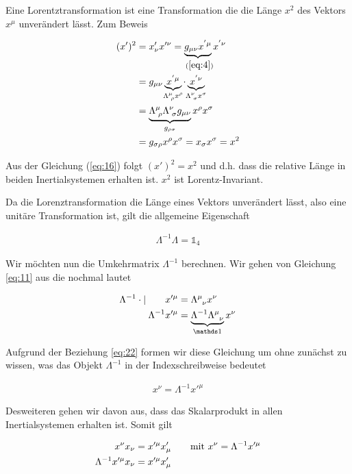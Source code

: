 Eine Lorentztransformation ist eine Transformation die die Länge \(x^2\)  des Vektors \(x^\mu\) unverändert lässt. Zum Beweis

\begin{align}
  \label{eq:16}
  (x')^2 &= x'_\nu x'^\nu = \underbr{ g_{\mu\nu}x^{'\mu}}_{~(\ref{eq:4})}x^{'\nu} \notag \\
&=  g_{\mu\nu}\underbr{ x^{'\mu}}_{\Lambda^\mu_{\,\, \rho}x^\rho}\cdot \underbr{ x^{'\nu}}_{\Lambda^\nu_{\,\, \sigma}x^\sigma} \notag \\
 &= \underbrace{\Lambda^\mu_{\,\, \rho}  \Lambda^\nu_{\,\, \sigma}g_{\mu\nu}}_{g_{\rho\sigma}}x^\rho x^\sigma\notag \\
&= g_{\sigma\rho} x^\rho x^\sigma  = x_\sigma x^\sigma = x^2
\end{align}

Aus der Gleichung (\ref{eq:16})  folgt  \((x')^2 = x^2\) und d.h. dass die relative Länge in beiden Inertialsystemen erhalten ist. \(x^2\) ist Lorentz-Invariant. 


Da die Lorenztransformation die Länge eines Vektors unverändert lässt, also eine unitäre Transformation ist, gilt die allgemeine Eigenschaft


\begin{align}
  \label{eq:22}
  \Lambda^{-1}\Lambda=\mathds 1_4
\end{align}

Wir möchten nun die Umkehrmatrix  \(\Lambda^{-1}\) berechnen. Wir gehen von Gleichung \eqref{eq:11} aus die nochmal lautet

\begin{align}
  \label{eq:21}
 \Lambda^{-1}\cdot|\qquad   x'^{\mu} &= \Lambda^{\mu}_{\hphantom \mu \nu}x^\nu \notag\\
 \Lambda^{-1}  x'^{\mu} &= \underbrace{ \Lambda^{-1}\Lambda^{\mu}_{\hphantom \mu \nu}}_{\mathds 1}x^\nu 
\end{align}

Aufgrund der Beziehung \eqref{eq:22} formen wir diese Gleichung um ohne zunächst zu wissen, was das Objekt \(\Lambda^{-1}\) in der Indexschreibweise bedeutet

\begin{align}
  \label{eq:23}
  x^{\nu} = \Lambda^{-1}x'^{\mu}
\end{align}

Desweiteren gehen wir davon aus, dass das Skalarprodukt in allen Inertialsystemen erhalten ist. Somit gilt

\begin{align}
  \label{eq:24}
  x^\nu x_\nu &= x'^{\mu}x'_{\mu} \qquad\text{mit } x^{\nu} = \Lambda^{-1}x'^{\mu}\notag\\
\Lambda^{-1}x'^{\mu} x_\nu &= x'^{\mu}x'_{\mu}
\end{align}

